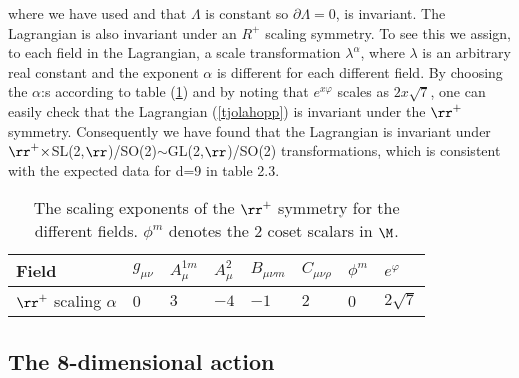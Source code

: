 where we have used  and that $\Lambda$ is constant so $\partial\Lambda = 0$, is invariant. 
The Lagrangian is also invariant under an $R^+$ scaling symmetry.
To see this we assign, to each field in the Lagrangian, a scale transformation $\lambda^\alpha$, where $\lambda$ is an arbitrary real constant and the exponent $\alpha$ is different for each different field.
By choosing the $\alpha$:s according to table (\ref{reduct_weights}) and by noting that $e^{x\varphi}$ scales as $2x\sqrt 7$, one can easily check that the Lagrangian (\ref{tjolahopp}) is invariant under the ${\rr}^+$ symmetry.
Consequently we have found that the Lagrangian is invariant under $\rr^+\times$SL(2,$\rr$)/SO(2)$\sim$GL(2,$\rr$)/SO(2) transformations, which is consistent with the expected data for d=9 in table 2.3.

\begin{table}
\begin{center}
\begin{tabular}{l|l l l l l l l}
Field & $g_{\mu\nu}$ & $A_\mu^{1m}$ & $A_\mu^2$ & $B_{\mu\nu m}$ & $C_{\mu\nu\rho}$ & $\phi^m$ & $e^\varphi$\\ \hline
$\rr^+$ scaling $\alpha$ & 0 & $3$ & $-4$ & $-1$ & $2$ & 0 & $2\sqrt 7$
\end{tabular}
\label{reduct_weights}
\caption{The scaling exponents of the ${\rr}^+$ symmetry for the different fields. $\phi^m$ denotes the 2 coset scalars in $\M$.} 
\end{center}
\end{table}

\subsection{The 8-dimensional action}

